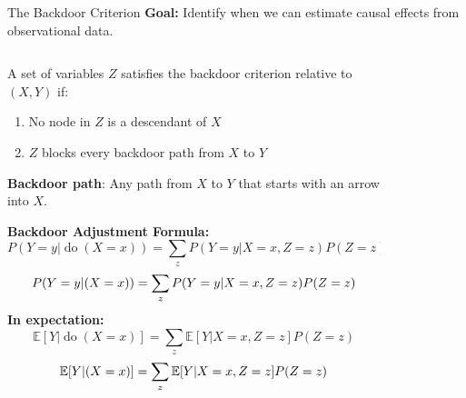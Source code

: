 \documentclass[aspectratio=169,11pt]{beamer}
\newcommand{\E}{\mathbb{E}}
\DeclareMathOperator{\doo}{do}
\begin{document}
\begin{frame}{The Backdoor Criterion}
\textbf{Goal:} Identify when we can estimate causal effects from observational data.

\begin{columns}
\begin{column}{0.5\textwidth}
\begin{definition}
A set of variables $Z$ satisfies the backdoor criterion relative to $(X, Y)$ if:
\begin{enumerate}
\item No node in $Z$ is a descendant of $X$
\item $Z$ blocks every backdoor path from $X$ to $Y$
\end{enumerate}
\end{definition}

\textbf{Backdoor path}: Any path from $X$ to $Y$ that starts with an arrow into $X$.

\textbf{Backdoor Adjustment Formula:}
\[P(Y = y | \doo(X = x)) = \sum_z P(Y = y | X = x, Z = z) P(Z = z)\]
\[P(Y = y | \do(X = x)) = \sum_z P(Y = y | X = x, Z = z) P(Z = z)\]
\textbf{In expectation:}
\[\E[Y | \doo(X = x)] = \sum_z \E[Y | X = x, Z = z] P(Z = z)\]
\[\E[Y | \do(X = x)] = \sum_z \E[Y | X = x, Z = z] P(Z = z)\]
\end{column}
\begin{column}{0.5\textwidth}
\begin{figure}
\centering
{}
\end{figure}


\end{column}
\end{columns}
\end{frame}
\end{document}
